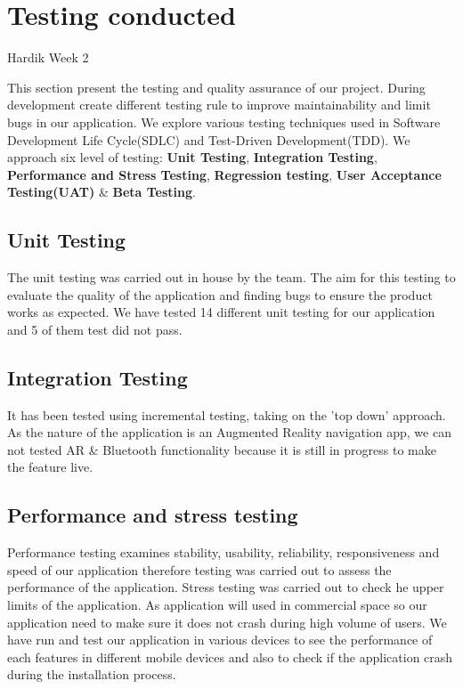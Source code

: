 \section{Testing conducted}
Hardik Week 2

This section present the testing and quality assurance of our project. During development  create different testing rule to improve maintainability and limit bugs in our application. We explore various testing techniques used in Software Development Life Cycle(SDLC) and Test-Driven Development(TDD).  We approach six level of testing: \textbf{Unit Testing}, \textbf{Integration Testing}, \textbf{Performance and Stress Testing}, \textbf{Regression testing}, \textbf{User Acceptance Testing(UAT)} \& \textbf{Beta Testing}.

\subsection{Unit Testing}
The unit testing was carried out in house by the team. The aim for this testing to evaluate the quality of the application and finding bugs to ensure the product works as expected. We have tested 14 different unit testing for our application and 5 of them test did not pass.

\subsection{Integration Testing}
It has been tested using incremental testing, taking on the 'top down' approach. As the nature of the application is an Augmented Reality navigation app, we can not tested AR \& Bluetooth functionality because it is still in progress to make the feature live.

\subsection{Performance and stress testing}
Performance testing examines stability, usability, reliability, responsiveness and speed of our application therefore testing was carried out to assess the performance of the application. Stress testing was carried out to check he upper limits of the application. As application will used in commercial space so our application need to make sure it does not crash during high volume of users. We have run and test our application in various devices to see the performance of each features in different mobile devices and also to check if the application crash during the installation process.

